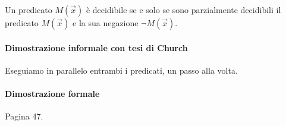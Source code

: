 Un predicato $M(\vec{x})$ è decidibile se e solo se sono parzialmente decidibili il predicato $M(\vec{x})$ e la sua negazione $\lnot M(\vec{x})$.

\paragraph{Dimostrazione informale con tesi di Church} Eseguiamo in parallelo entrambi i predicati, un passo alla volta.

\paragraph{Dimostrazione formale} Pagina 47.
